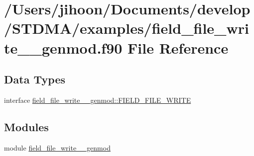 \hypertarget{field__file__write____genmod_8f90}{}\section{/\+Users/jihoon/\+Documents/develop/\+S\+T\+D\+M\+A/examples/field\+\_\+file\+\_\+write\+\_\+\+\_\+genmod.f90 File Reference}
\label{field__file__write____genmod_8f90}
\subsection*{Data Types}
\begin{DoxyCompactItemize}
\item 
interface \mbox{\hyperlink{interfacefield__file__write____genmod_1_1_f_i_e_l_d___f_i_l_e___w_r_i_t_e}{field\+\_\+file\+\_\+write\+\_\+\+\_\+genmod\+::\+F\+I\+E\+L\+D\+\_\+\+F\+I\+L\+E\+\_\+\+W\+R\+I\+TE}}
\end{DoxyCompactItemize}
\subsection*{Modules}
\begin{DoxyCompactItemize}
\item 
module \mbox{\hyperlink{namespacefield__file__write____genmod}{field\+\_\+file\+\_\+write\+\_\+\+\_\+genmod}}
\end{DoxyCompactItemize}
